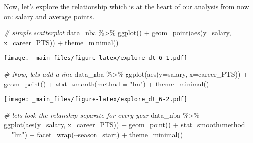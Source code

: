 \documentclass[
]{book}
\newenvironment{Shaded}{\begin{snugshade}}{\end{snugshade}}
\newcommand{\AttributeTok}[1]{\textcolor[rgb]{0.77,0.63,0.00}{#1}}
\newcommand{\CommentTok}[1]{\textcolor[rgb]{0.56,0.35,0.01}{\textit{#1}}}
\newcommand{\FunctionTok}[1]{\textcolor[rgb]{0.00,0.00,0.00}{#1}}
\newcommand{\NormalTok}[1]{#1}
\newcommand{\SpecialCharTok}[1]{\textcolor[rgb]{0.00,0.00,0.00}{#1}}
\newcommand{\StringTok}[1]{\textcolor[rgb]{0.31,0.60,0.02}{#1}}
\begin{document}
Now, let's explore the relationship which is at the heart of our analysis from now on: salary and average points.

\begin{Shaded}
\begin{Highlighting}[]
\CommentTok{\# simple scatterplot}
\NormalTok{data\_nba }\SpecialCharTok{\%\textgreater{}\%} \FunctionTok{ggplot}\NormalTok{() }\SpecialCharTok{+}
\FunctionTok{geom\_point}\NormalTok{(}\FunctionTok{aes}\NormalTok{(}\AttributeTok{y=}\NormalTok{salary, }\AttributeTok{x=}\NormalTok{career\_PTS)) }\SpecialCharTok{+} 
  \FunctionTok{theme\_minimal}\NormalTok{()}
\end{Highlighting}
\end{Shaded}

\texttt{[image: \_main\_files/figure-latex/explore\_dt\_6-1.pdf]}

\begin{Shaded}
\begin{Highlighting}[]
\CommentTok{\# Now, let\textquotesingle{}s add a line}
\NormalTok{data\_nba }\SpecialCharTok{\%\textgreater{}\%} 
  \FunctionTok{ggplot}\NormalTok{(}\FunctionTok{aes}\NormalTok{(}\AttributeTok{y=}\NormalTok{salary, }\AttributeTok{x=}\NormalTok{career\_PTS)) }\SpecialCharTok{+}
    \FunctionTok{geom\_point}\NormalTok{() }\SpecialCharTok{+} 
     \FunctionTok{stat\_smooth}\NormalTok{(}\AttributeTok{method =} \StringTok{"lm"}\NormalTok{) }\SpecialCharTok{+} 
       \FunctionTok{theme\_minimal}\NormalTok{()}
\end{Highlighting}
\end{Shaded}

\texttt{[image: \_main\_files/figure-latex/explore\_dt\_6-2.pdf]}

\begin{Shaded}
\begin{Highlighting}[]
\CommentTok{\# let\textquotesingle{}s look the relatiship separate for every year}
\NormalTok{data\_nba }\SpecialCharTok{\%\textgreater{}\%} 
  \FunctionTok{ggplot}\NormalTok{(}\FunctionTok{aes}\NormalTok{(}\AttributeTok{y=}\NormalTok{salary, }\AttributeTok{x=}\NormalTok{career\_PTS)) }\SpecialCharTok{+}
    \FunctionTok{geom\_point}\NormalTok{() }\SpecialCharTok{+} 
     \FunctionTok{stat\_smooth}\NormalTok{(}\AttributeTok{method =} \StringTok{"lm"}\NormalTok{) }\SpecialCharTok{+} 
        \FunctionTok{facet\_wrap}\NormalTok{(}\SpecialCharTok{\textasciitilde{}}\NormalTok{season\_start) }\SpecialCharTok{+} 
       \FunctionTok{theme\_minimal}\NormalTok{()}
\end{Highlighting}
\end{Shaded}
\end{document}
